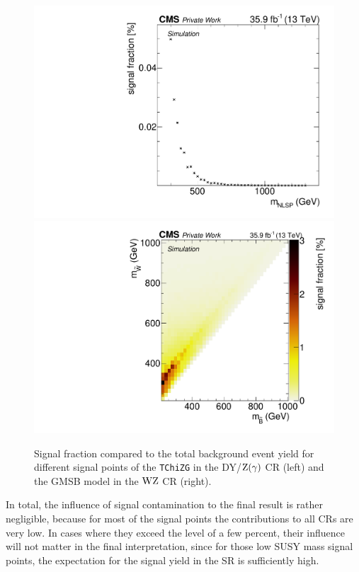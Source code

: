 \begin{figure}
 \includegraphics[width=\pairwidth]{figures/contamination/tching_DY}
 \includegraphics[width=\pairwidth]{figures/contamination/gmsb_WZ}
 \caption{Signal fraction compared to the total background event yield for different signal points of the \texttt{TChiZG} in the DY/$\mathrm{Z}(\gamma)$ CR (left) and the GMSB model in the $\mathrm{W}\mathrm{Z}$ CR (right).}
 \label{fig:signalCont}
\end{figure}
In total, the influence of signal contamination to the final result is rather negligible, because for most of the signal points the contributions to all CRs are very low. In cases where they exceed the level of a few percent, their influence will not matter in the final interpretation, since for those low SUSY mass signal points, the expectation for the signal yield in the SR is sufficiently high.


